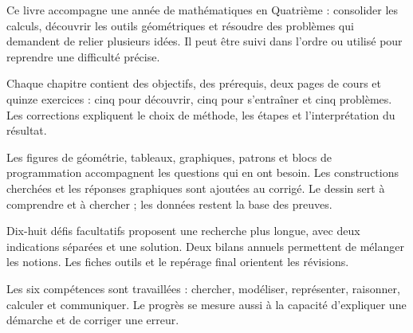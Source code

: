 \clearpage\thispagestyle{otFront}\label{avant-propos}\fontsize{11}{15}\selectfont

Ce livre accompagne une année de mathématiques en Quatrième : consolider
les calculs, découvrir les outils géométriques et résoudre des problèmes
qui demandent de relier plusieurs idées. Il peut être suivi dans l’ordre
ou utilisé pour reprendre une difficulté précise.\par\medskip
\begin{savoirfaire}Chaque chapitre contient des objectifs, des prérequis, deux pages de cours et quinze exercices : cinq pour découvrir, cinq pour s’entraîner et cinq problèmes. Les corrections expliquent le choix de méthode, les étapes et l’interprétation du résultat.\end{savoirfaire}
\begin{savoirfaire}Les figures de géométrie, tableaux, graphiques, patrons et blocs de programmation accompagnent les questions qui en ont besoin. Les constructions cherchées et les réponses graphiques sont ajoutées au corrigé. Le dessin sert à comprendre et à chercher ; les données restent la base des preuves.\end{savoirfaire}
\begin{savoirfaire}Dix-huit défis facultatifs proposent une recherche plus longue, avec deux indications séparées et une solution. Deux bilans annuels permettent de mélanger les notions. Les fiches outils et le repérage final orientent les révisions.\end{savoirfaire}
Les six compétences sont travaillées : chercher, modéliser, représenter,
raisonner, calculer et communiquer. Le progrès se mesure aussi à la capacité
d’expliquer une démarche et de corriger une erreur.

\clearpage
